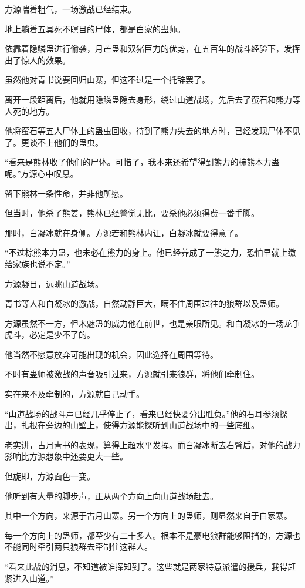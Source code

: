 \begin{this_body}
方源喘着粗气，一场激战已经结束。

地上躺着五具死不瞑目的尸体，都是白家的蛊师。

依靠着隐鳞蛊进行偷袭，月芒蛊和双猪巨力的优势，在五百年的战斗经验下，发挥出了惊人的效果。

虽然他对青书说要回归山寨，但这不过是一个托辞罢了。

离开一段距离后，他就用隐鳞蛊隐去身形，绕过山道战场，先后去了蛮石和熊力等人死的地方。

他将蛮石等五人尸体上的蛊虫回收，待到了熊力失去的地方时，已经发现尸体不见了。更谈不上他们的蛊虫。

“看来是熊林收了他们的尸体。可惜了，我本来还希望得到熊力的棕熊本力蛊呢。”方源心中叹息。

留下熊林一条性命，并非他所愿。

但当时，他杀了熊姜，熊林已经警觉无比，要杀他必须得费一番手脚。

那时，白凝冰就在身侧。方源若和熊林内讧，白凝冰就要得意了。

“不过棕熊本力蛊，也未必在熊力的身上。他已经养成了一熊之力，恐怕早就上缴给家族也说不定。”

方源凝目，远眺山道战场。

青书等人和白凝冰的激战，自然动静巨大，瞒不住周围过往的狼群以及蛊师。

方源虽然不一方，但木魅蛊的威力他在前世，也是亲眼所见。和白凝冰的一场龙争虎斗，必定是少不了的。

他当然不愿意放弃可能出现的机会，因此选择在周围等待。

不时有蛊师被激战的声音吸引过来，方源就引来狼群，将他们牵制住。

实在来不及牵制的，方源就自己动手。

“山道战场的战斗声已经几乎停止了，看来已经快要分出胜负。”他的右耳参须探出，扎根在旁边的山壁上，使得方源能探听到山道战场中的一些底细。

老实讲，古月青书的表现，算得上超水平发挥。而白凝冰断去右臂后，对他的战力影响比方源想象中还要更大一些。

但旋即，方源面色一变。

他听到有大量的脚步声，正从两个方向上向山道战场赶去。

其中一个方向，来源于古月山寨。另一个方向上的蛊师，则显然来自于白家寨。

每一个方向上的蛊师，都至少有二十多人。根本不是豪电狼群能够阻挡的，方源也不能同时牵引两只狼群去牵制住这群人。

“看来此战的消息，不知道被谁探知到了。这些就是两家特意派遣的援兵，我得赶紧进入山道。”


\end{this_body}
